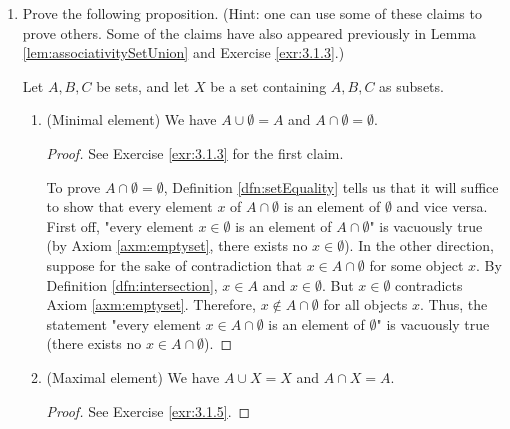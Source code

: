 \documentclass[../main.tex]{subfiles}
\begin{document}
\begin{enumerate}[ref={\thesection.\arabic*}]
\begin{proof}
    \end{proof}
    \item \label{exr:3.1.6}Prove the following proposition. (Hint: one can use some of these claims to prove others. Some of the claims have also appeared previously in Lemma \ref{lem:associativitySetUnion} and Exercise \ref{exr:3.1.3}.)
    \begin{prp}\label{prp:booleanAlgebra}
        Let $A,B,C$ be sets, and let $X$ be a set containing $A,B,C$ as subsets.
        \begin{enumerate}[label={\textup{(}\alph*\textup{)}},ref={\theenumi\alph*}]
            \item \label{exr:3.1.6a}(Minimal element) We have $A\cup\emptyset=A$ and $A\cap\emptyset=\emptyset$.
            \begin{proof}
                See Exercise \ref{exr:3.1.3} for the first claim.\par
                To prove $A\cap\emptyset=\emptyset$, Definition \ref{dfn:setEquality} tells us that it will suffice to show that every element $x$ of $A\cap\emptyset$ is an element of $\emptyset$ and vice versa.
                First off, "every element $x\in\emptyset$ is an element of $A\cap\emptyset$" is vacuously true (by Axiom \ref{axm:emptyset}, there exists no $x\in\emptyset$). In the other direction, suppose for the sake of contradiction that $x\in A\cap\emptyset$ for some object $x$. By Definition \ref{dfn:intersection}, $x\in A$ and $x\in \emptyset$. But $x\in\emptyset$ contradicts Axiom \ref{axm:emptyset}. Therefore, $x\notin A\cap\emptyset$ for all objects $x$. Thus, the statement "every element $x\in A\cap\emptyset$ is an element of $\emptyset$" is vacuously true (there exists no $x\in A\cap\emptyset$).
            \end{proof}
            \item \label{exr:3.1.6b}(Maximal element) We have $A\cup X=X$ and $A\cap X=A$.
            \begin{proof}
                See Exercise \ref{exr:3.1.5}.
            \end{proof}

\end{enumerate}
\end{prp}
\end{enumerate}
\end{document}
